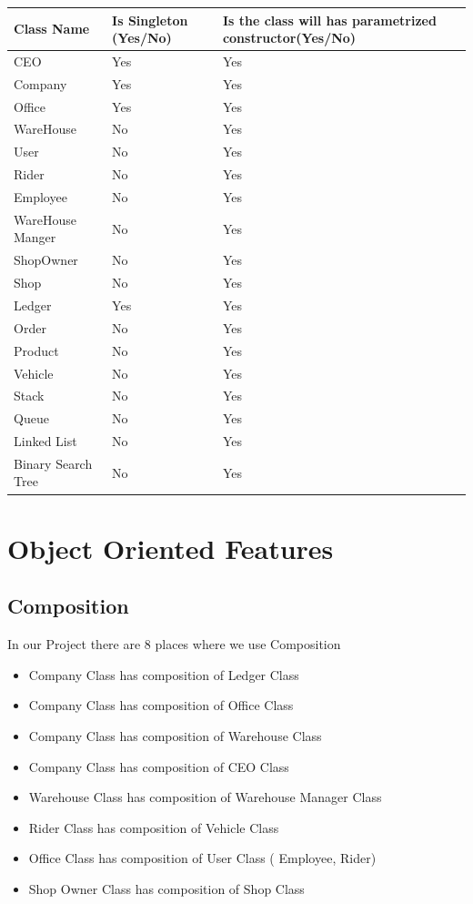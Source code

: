 \documentclass[12pt,a4paper]{report}
\begin{document}
\begin{center}
\begin{tabular}{ | m{4cm}|m{4cm}|m{4cm}|} 
 \hline

\textbf{ Class Name} &\textbf{ Is Singleton (Yes/No)} &\textbf {Is the class will has parametrized constructor(Yes/No)}\\ \hline
 CEO 		&Yes	&Yes \\\hline
Company		&Yes	&Yes \\\hline
Office		&Yes	&Yes \\\hline
WareHouse	&No		&Yes \\\hline
User		&No		&Yes \\\hline
Rider		&No		&Yes \\\hline
Employee  	&No		&Yes \\\hline
WareHouse Manger  &No		&Yes\\ \hline
ShopOwner 	&No		&Yes\\ \hline
Shop	  	&No		&Yes \\ \hline
Ledger	  	&Yes	&Yes \\ \hline
Order		&No		&Yes \\ \hline
Product		&No		&Yes \\ \hline
Vehicle		&No		&Yes \\ \hline
Stack		&No		&Yes \\ \hline
Queue		&No		&Yes \\ \hline
Linked List	&No		&Yes \\ \hline
Binary Search Tree  &No		&Yes\\  \hline
\end{tabular}
\end{center}
\newpage
\chapter {Object Oriented Features}
\section{Composition}
In our Project there are 8 places where we use Composition
\begin{itemize}
\item   Company Class has composition of Ledger Class
\item  Company Class has composition of Office Class
\item  Company Class has composition of Warehouse Class
\item  Company Class has composition of CEO Class
\item  Warehouse Class has composition of  Warehouse Manager Class
\item  Rider Class has composition of Vehicle Class
\item  Office Class has composition of User Class ( Employee, Rider)
\item  Shop Owner Class has composition of Shop Class
\end{itemize}
\end{document}
